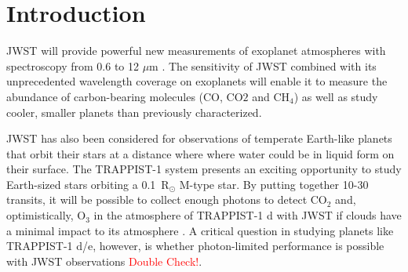 \documentclass{aastex62}
\begin{document}


\section{Introduction} \label{sec:intro}

JWST will provide powerful new measurements of exoplanet atmospheres with spectroscopy from 0.6 to 12 $\mu$m
\citep{beichman2014pasp,greene2016jwst_trans,howe2017informationJWST,barstow2015jwstSystematics,schlawin2018JWSTforecasts}.
The sensitivity of JWST combined with its unprecedented wavelength coverage on exoplanets will enable it to measure the abundance of carbon-bearing molecules (CO, CO$2$ and CH$_4$) as well as study cooler, smaller planets than previously characterized.

JWST has also been considered for observations of temperate Earth-like planets that orbit their stars at a distance where where water could be in liquid form on their surface.
The TRAPPIST-1 system \citep{gillon2016trappist1Discovery,gillon2017trappist-1sevenp} presents an exciting opportunity to study Earth-sized stars orbiting a 0.1~R$_\odot$ M-type star.
By putting together 10-30 transits, it will be possible to collect enough photons to detect CO$_2$ \citep{barstow2016trappist1habitable,krissansen-totton2018trappist1eJWST} and, optimistically, O$_3$ in the atmosphere of TRAPPIST-1 d with JWST if clouds have a minimal impact to its atmosphere \citep{barstow2016trappist1habitable}.
A critical question in studying planets like TRAPPIST-1 d/e, however, is whether photon-limited performance is possible with JWST observations \textcolor{red}{Double Check!}.
\end{document}

